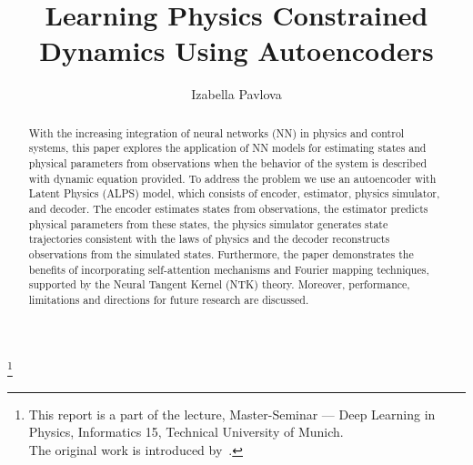 \documentclass[acmtog]{techreportacmart}
\begin{document}
\title{Learning Physics Constrained Dynamics Using Autoencoders} 
\author{Izabella Pavlova}

\renewcommand\shortauthors{Pavlova}

\begin{abstract}
With the increasing integration of neural networks (NN) in physics and control systems, this paper explores the application of NN models for estimating states and physical parameters from observations when the behavior of the system is described with dynamic equation provided. To address the problem we use an autoencoder with Latent Physics (ALPS) model, which consists of encoder, estimator, physics simulator, and decoder. The encoder estimates states from observations, the estimator predicts physical parameters from these states, the physics simulator generates state trajectories consistent with the laws of physics and the decoder reconstructs observations from the simulated states. Furthermore, the paper demonstrates the benefits of incorporating self-attention mechanisms and Fourier mapping techniques, supported by the Neural Tangent Kernel (NTK) theory. Moreover, performance, limitations and directions for future research are discussed.
\end{abstract}

%
%



\thanks{This report is a part of the lecture, Master-Seminar --- Deep Learning in Physics, Informatics 15, Technical University of Munich.
\\
The original work is introduced by~\cite{NEURIPS2022_6d5e0357}.}
\maketitle
\end{document}
